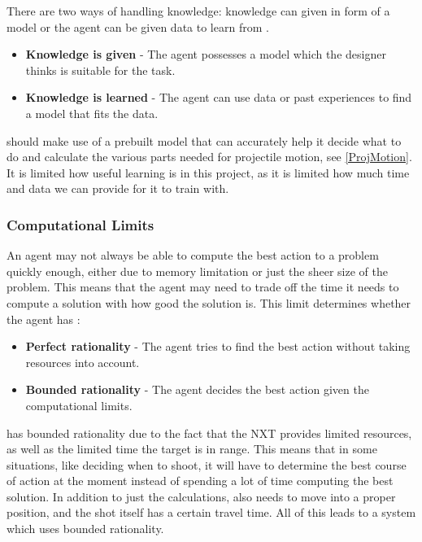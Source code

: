 There are two ways of handling knowledge: knowledge can given in form of a
model or the agent can be given data to learn from \citep[Ch. 1.5.7]{MIBook}. 
\begin{itemize}
  \item \textbf{Knowledge is given} - The agent possesses a model which the
designer thinks is suitable for the task.
  \item \textbf{Knowledge is learned} - The agent can use data or past
  experiences to find a model that fits the data.
\end{itemize}

\name should make use of a prebuilt model that can accurately help it decide
what to do and calculate the various parts needed for projectile motion, see
\autoref{ProjMotion}. It is limited how useful learning is in this project, as
it is limited how much time and data we can provide for it to train with.

\subsubsection{Computational Limits}
An agent may not always be able to compute the best action to a problem quickly
enough, either due to memory limitation or just the sheer size of the problem.
This means that the agent may need to trade off the time it needs to compute a
solution with how good the solution is. This limit determines whether the agent
has \citep[Ch. 1.5.8]{MIBook}:

\begin{itemize}
  \item \textbf{Perfect rationality} - The agent tries to find the best action
  without taking resources into account.
  \item \textbf{Bounded rationality} - The agent decides the best action given
  the computational limits.
\end{itemize}

\name has bounded rationality due to the fact that the NXT provides limited
resources, as well as the limited time the target is in range. This means that
in some situations, like deciding when to shoot, it will have to determine the
best course of action at the moment instead of spending a lot of time computing
the best solution. In addition to just the calculations, \name also needs to
move into a proper position, and the shot itself has a certain travel time. All
of this leads to a system which uses bounded rationality.

